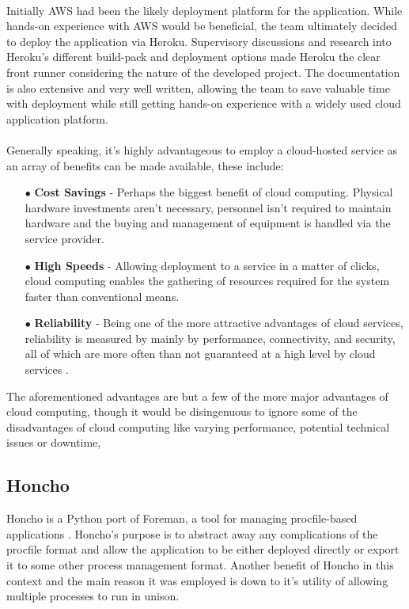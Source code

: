 \paragraph{}
Initially AWS had been the likely deployment platform for the application. While hands-on experience with AWS would be beneficial, the team ultimately decided to deploy the application via Heroku. Supervisory discussions and research into Heroku's different build-pack and deployment options made Heroku the clear front runner considering the nature of the developed project. The documentation is also extensive and very well written, allowing the team to save valuable time with deployment while still getting hands-on experience with a widely used cloud application platform.

\paragraph{}
Generally speaking, it's highly advantageous to employ a cloud-hosted service as an array of benefits  can be made available, these include:

\begin{enumerate}
    \item[$\bullet$] \textbf{Cost Savings} - Perhaps the biggest benefit of cloud computing. Physical hardware investments aren't necessary, personnel isn't required to maintain hardware and the buying and management of equipment is handled via the service provider.
    \item[$\bullet$] \textbf{High Speeds} - Allowing deployment to a service in a matter of clicks, cloud computing enables the gathering of resources required for the system faster than conventional means.
    \item[$\bullet$] \textbf{Reliability} - Being one of the more attractive advantages of cloud services, reliability is measured by mainly by performance, connectivity, and security, all of which are more often than not guaranteed at a high level by cloud services .
\end{enumerate}

The aforementioned advantages \cite{CLOUD} are but a few of the more major advantages of cloud computing, though it would be disingenuous to ignore some of the disadvantages of cloud computing like varying performance, potential technical issues or downtime, 

\subsection{Honcho}
Honcho is a Python port of Foreman, a tool for managing procfile-based applications \cite{HONCHO}. Honcho's purpose is to abstract away any complications of the procfile format and allow the application to be either deployed directly or export it to some other process management format. Another benefit of Honcho in this context and the main reason it was employed is down to it's utility of allowing multiple processes to run in unison.

